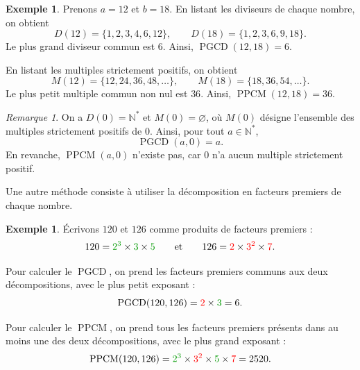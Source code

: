 \documentclass[12pt,a4paper]{article}
\theoremstyle{plain}
\theoremstyle{definition}
\newtheorem{example}[theorem]{Exemple}
\theoremstyle{remark}
\newtheorem*{remark}{Remarque}
\DeclareMathOperator{\ppcm}{PPCM}
\DeclareMathOperator{\pgcd}{PGCD}
\begin{document}
\begin{example}
  Prenons $a=12$ et $b=18$. En listant les diviseurs de chaque nombre,
  on obtient
  \[
    D(12)=\{1,2,3,4,6,12\},\qquad
    D(18)=\{1,2,3,6,9,18\}.
  \]
  Le plus grand diviseur commun est $6$. Ainsi, $\pgcd(12,18)=6$.

  En listant les multiples strictement positifs, on obtient
  \[
    M(12)=\{12,24,36,48,\ldots\},\qquad
    M(18)=\{18,36,54,\ldots\}.
  \]
  Le plus petit multiple commun non nul est $36$.
  Ainsi, $\ppcm(12,18)=36$.
  \label{eg:div_gcd}
\end{example}

\begin{remark}
  On a $D(0)=\mathbb{N}^*$ et $M(0)=\varnothing$, où $M(0)$ désigne
  l'ensemble des multiples strictement positifs de $0$.
  Ainsi, pour tout $a\in\mathbb{N}^*$,
  \[
    \pgcd(a,0)=a.
  \]
  En revanche, $\ppcm(a,0)$ n'existe pas, car $0$ n'a aucun multiple
  strictement positif.
\end{remark}

Une autre méthode consiste à utiliser la décomposition en facteurs
premiers de chaque nombre.

\begin{example}
  Écrivons $120$ et $126$ comme produits de facteurs premiers :
  \[
    120=\textcolor{green!60!black}{2^3}
      \times\textcolor{green!60!black}{3}
      \times\textcolor{green!60!black}{5}
    \qquad\text{et}\qquad
    126=\textcolor{red}{2}
      \times\textcolor{red}{3^2}
      \times\textcolor{red}{7}.
  \]

  Pour calculer le $\pgcd$, on prend les facteurs premiers communs aux deux
  décompositions, avec le plus petit exposant :
  \[
    \pgcd(120,126)
    =\textcolor{red}{2}\times\textcolor{green!60!black}{3}
    =6.
  \]

  Pour calculer le $\ppcm$, on prend tous les facteurs premiers présents
  dans au moins une des deux décompositions, avec le plus grand exposant :
  \[
    \ppcm(120,126)
    =\textcolor{green!60!black}{2^3}
      \times\textcolor{red}{3^2}
      \times\textcolor{green!60!black}{5}
      \times\textcolor{red}{7}
    =2520.
  \]
  \label{eg:fact_gcd}
\end{example}
\end{document}
